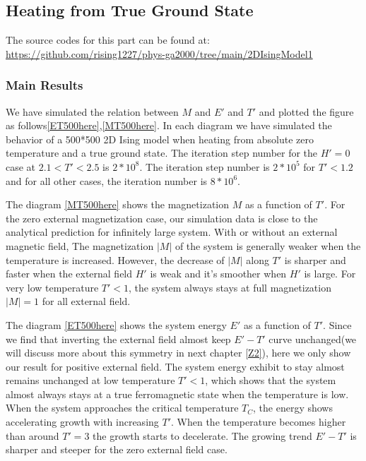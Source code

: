 \documentclass[11pt]{article}
\begin{document}
\subsection{Heating from True Ground State}\label{heating}

The source codes for this part can be found at: \url{https://github.com/rising1227/phys-ga2000/tree/main/2DIsingModel1}

\subsubsection{Main Results}

We have simulated the relation between $M$ and $E'$ and $T'$ and plotted the figure as follows\ref{ET500here},\ref{MT500here}. In each diagram we have simulated the behavior of a 500*500 2D Ising model when heating from absolute zero temperature and a true ground state. The iteration step number for the $H'=0$ case at $2.1 < T' < 2.5$ is $2*10^8$. The iteration step number is $2*10^5$ for $T' < 1.2$ and for all other cases, the iteration number is $8*10^6$. 

The diagram \ref{MT500here} shows the magnetization $M$ as a function of $T'$. For the zero external magnetization case, our simulation data is close to the analytical prediction for infinitely large system. With or without an external magnetic field, The magnetization $|M|$ of the system is generally weaker when the temperature is increased. However, the decrease of $|M|$ along $T'$ is sharper and faster when the external field $H'$ is weak and it's smoother when $H'$ is large. For very low temperature $T' < 1$, the system always stays at full magnetization $|M| = 1$ for all external field.

The diagram \ref{ET500here} shows the system energy $E'$ as a function of $T'$. Since we find that inverting the external field almost keep $E'-T'$ curve unchanged(we will discuss more about this symmetry in next chapter \ref{Z2}), here we only show our result for positive external field. The system energy exhibit to stay almost remains unchanged at low temperature $T'<1$, which shows that the system almost always stays at a true ferromagnetic state when the temperature is low. When the system approaches the critical temperature $T_C$, the energy shows accelerating growth with increasing $T'$. When the temperature becomes higher than around $T'=3$ the growth starts to decelerate. The growing trend $E'-T'$ is sharper and steeper for the zero external field case.
\end{document}
